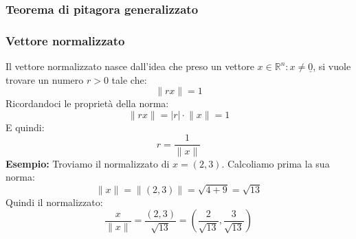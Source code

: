 \subsubsection{Teorema di pitagora generalizzato}



\subsubsection{Vettore normalizzato}
Il vettore normalizzato nasce dall'idea che preso un vettore $x \in \mathbb{R}^n: x \neq \underline{0}$, si vuole trovare un numero $r > 0$ tale che:
\begin{equation*}
	\lVert rx \rVert = 1
\end{equation*}
Ricordandoci le proprietà della norma: 
\begin{equation*}
	\lVert rx \rVert = |r| \cdot \lVert x \rVert = 1
\end{equation*}
E quindi:
\begin{equation*}
	r = \dfrac{1}{\lVert x \rVert}
\end{equation*}
\textbf{Esempio:} Troviamo il normalizzato di $x = (2, 3)$. Calcoliamo prima la sua norma:
\begin{equation*}
	\lVert x \rVert = \lVert (2, 3) \rVert = \sqrt{4+9} = \sqrt{13}
\end{equation*}
Quindi il normalizzato:
\begin{equation*}
	\dfrac{x}{\lVert x \rVert} = \dfrac{(2, 3)}{\sqrt{13}} = \left(\dfrac{2}{\sqrt{13}}, \dfrac{3}{\sqrt{13}}\right)
\end{equation*}

